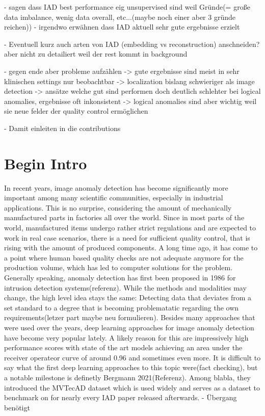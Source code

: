 - sagen dass IAD best performance eig unsupervised sind weil Gründe(= große data imbalance, wenig data overall, etc...(maybe noch einer aber 3 gründe reichen))
- irgendwo erwähnen dass IAD aktuell sehr gute ergebnisse erzielt

- Eventuell kurz auch arten von IAD (embedding vs reconstruction) anschneiden? aber nicht zu detailiert weil der rest kommt in background

- gegen ende aber probleme aufzählen 
-> gute ergebnisse sind meist in sehr klinischen settings nur beobachtbar
-> localization bislang schwieriger als image detection
-> ansätze welche gut sind performen doch deutlich schlehter bei logical anomalies, ergebnisse oft inkonsistent
-> logical anomalies sind aber wichtig weil sie neue felder der quality control ermöglichen

- Damit einleiten in die contributions





\section{Begin Intro}
In recent years, image anomaly detection has become significantly more important among many scientific communities, especially in industrial applications. This is no surprise, considering the
amount of mechanically manufactured parts in factories all over the world. Since in most parts of the world, manufactured items undergo rather strict regulations and are expected to work
in real case scenarios, there is a need for sufficient quality control, that is rising with the amount of produced components. A long time ago, it has come to a point where human based quality 
checks are not adequate anymore for the production volume, which has led to computer solutions for the problem. Generally speaking, anomaly detection has first been proposed in 1986 for 
intrusion detection systems(referenz). While the methods and modalities may change, the high level idea stays the same: Detecting data that deviates from a set standard to a degree that is becoming
problematatic regarding the own requirements(letzer part maybe neu formulieren). Besides many approaches that were used over the years, deep learning approaches for image anomaly detection have
become very popular lately. A likely reason for this are impressively high performance scores with state of the art models achieving an area under the receiver operateor curve of around 0.96 and 
sometimes even more.
It is difficult to say what the first deep learning approaches to this topic were(fact checking), but a notable milestone is definetly Bergmann 2021(Referenz). Among blabla, they introduced
the MVTecAD dataset which is used widely and serves as a dataset to benchmark on for nearly every IAD paper released afterwards. - Übergang benötigt

